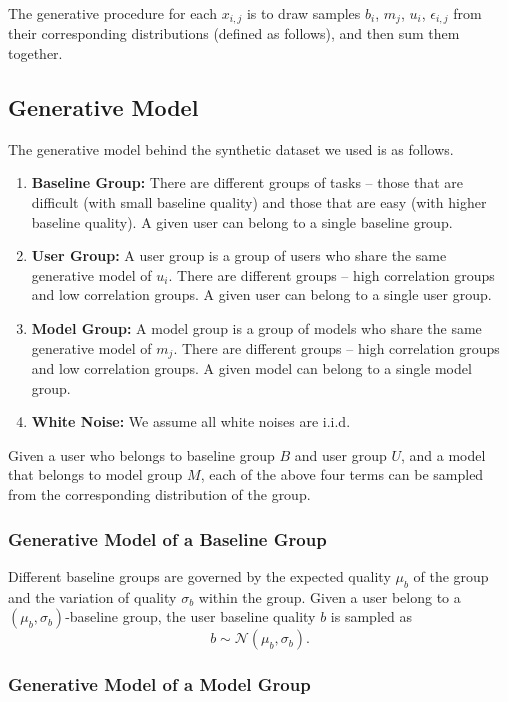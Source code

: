 \documentclass[letterpaper]{vldb}
\begin{document}
The generative procedure for each $x_{i,j}$ is to draw samples 
$b_i$, $m_j$, $u_i$, $\epsilon_{i,j}$ from their corresponding 
distributions (defined as follows), and then sum them together.

\subsection{Generative Model}

The generative model behind the synthetic dataset we used is as follows.

\begin{enumerate}
\item {\bf Baseline Group:} There are different groups of tasks -- those that are difficult (with small
baseline quality) and those that are easy (with higher baseline quality). A given user can belong
to a single baseline group.
\item {\bf User Group:} A user group is a group of users who share the
same generative model of $u_i$. There are different groups -- high correlation groups
and low correlation groups. A given user can belong to a single user group.
\item {\bf Model Group:} A model group is a group of models who share
the same generative model of $m_j$. There are different groups -- high correlation groups
and low correlation groups. A given model can belong to a single model group.
\item {\bf White Noise:} We assume all white noises are i.i.d.
\end{enumerate}

Given a user who belongs to baseline group $B$ and user group $U$,
and a model that belongs to model group $M$, each of the above four terms
can be sampled from the corresponding distribution of the group.

\subsubsection{Generative Model of a Baseline Group}

Different baseline groups are governed by the expected quality $\mu_b$ of the group
and the variation of quality $\sigma_b$ within the group. Given a user
belong to a $(\mu_b, \sigma_b)$-baseline group, the user baseline quality 
$b$ is sampled as
\[
b \sim \mathcal{N}(\mu_b, \sigma_b).
\]

\subsubsection{Generative Model of a Model Group}
\end{document}

